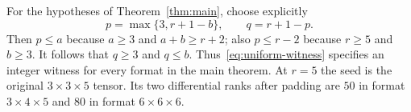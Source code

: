 For the hypotheses of Theorem~\ref{thm:main}, choose explicitly
\begin{equation}\label{eq:seed-choice}
 p=\max\{3,r+1-b\},\qquad q=r+1-p.
\end{equation}
Then $p\leq a$ because $a\geq3$ and $a+b\geq r+2$;
also $p\leq r-2$ because $r\geq5$ and $b\geq3$.
It follows that $q\geq3$ and $q\leq b$.
Thus~\eqref{eq:uniform-witness} specifies an integer witness for every
format in the main theorem. At $r=5$ the seed is the original
$3\times3\times5$ tensor. Its two differential ranks after padding
are $50$ in format $3\times4\times5$ and $80$ in format
$6\times6\times6$.
